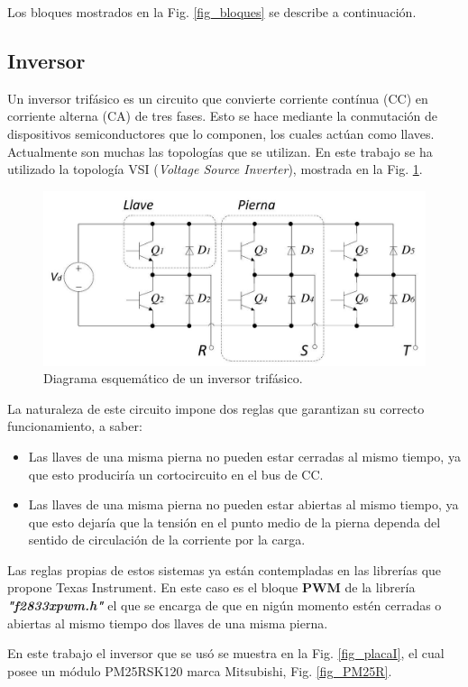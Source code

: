 \documentclass[conference]{IEEEtran}
\begin{document}
Los bloques mostrados en la Fig. \ref{fig_bloques} se describe a continuación.



\subsection{Inversor}
Un inversor trifásico es un circuito que convierte corriente contínua (CC) en corriente alterna (CA) de tres fases. Esto se hace mediante la conmutación de dispositivos semiconductores que lo componen, los cuales actúan como llaves. Actualmente son muchas las topologías que se utilizan. En este trabajo se ha utilizado la topología VSI  (\textit{Voltage Source Inverter})\cite{Rashid}, mostrada en la Fig. \ref{fig_esqInv}.

\begin{figure}[!t]
\centering
\includegraphics[width=8 cm]{figuras/figura_08.jpeg}
\caption{Diagrama esquemático de un inversor trifásico.} 
\label{fig_esqInv}
\end{figure}

La naturaleza de este circuito impone dos reglas que garantizan su correcto funcionamiento, a saber:

\begin{itemize}
\item Las llaves de una misma pierna no pueden estar cerradas al mismo tiempo, ya que esto produciría un cortocircuito en el bus de CC.
\item Las llaves de una misma pierna no pueden estar abiertas al mismo tiempo, ya que esto dejaría que la tensión en el punto medio de la pierna dependa del sentido de circulación de la corriente por la carga.
\end{itemize}

Las reglas propias de estos sistemas ya están contempladas en las librerías que propone Texas Instrument. En este caso es el bloque \textbf{PWM} de la librería \textbf{\textit{"f2833xpwm.h"}} el que se encarga de que en nigún momento estén cerradas o abiertas al mismo tiempo dos llaves de una misma pierna.

En este trabajo el inversor que se usó se muestra en la Fig. \ref{fig_placaI}, el cual posee un módulo PM25RSK120 marca Mitsubishi, Fig. \ref{fig_PM25R}.
\end{document}
